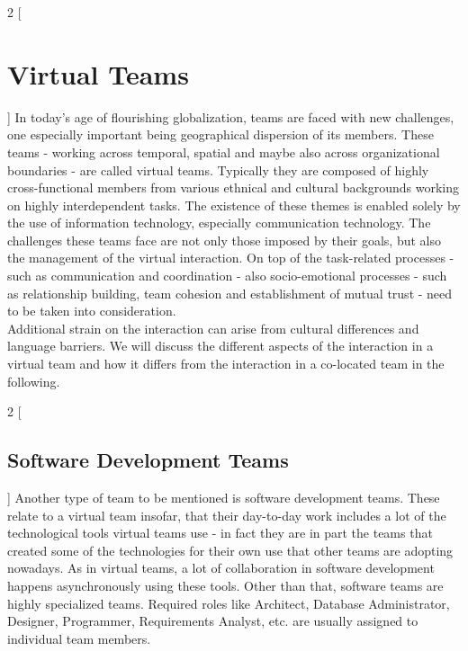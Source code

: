 \begin{multicols}{2}
[\section{Virtual Teams}]
In today's age of flourishing globalization, teams are faced with new challenges, one especially important being geographical dispersion of its members. These teams - working across temporal, spatial and maybe also across organizational boundaries - are called virtual teams. Typically they are composed of highly cross-functional members from various ethnical and cultural backgrounds working on highly interdependent tasks. The existence of these themes is enabled solely by the use of information technology, especially communication technology.
The challenges these teams face are not only those imposed by their goals, but also the management of the virtual interaction. On top of the task-related processes - such as communication and coordination - also socio-emotional processes - such as relationship building, team cohesion and establishment of mutual trust - need to be taken into consideration.\\\cite{Powell_Piccoli_Ives_2004} Additional strain on the interaction can arise from cultural differences and language barriers. We will discuss the different aspects of the interaction in a virtual team and how it differs from the interaction in a co-located team in the following.
\end{multicols}

\begin{multicols}{2}
[\subsection{Software Development Teams}]
Another type of team to be mentioned is software development teams. These relate to a virtual team insofar, that their day-to-day work includes a lot of the technological tools virtual teams use - in fact they are in part the teams that created some of the technologies for their own use that other teams are adopting nowadays. As in virtual teams, a lot of collaboration in software development happens asynchronously using these tools. Other than that, software teams are highly specialized teams. Required roles like Architect, Database Administrator, Designer, Programmer, Requirements Analyst, etc. \cite{IBM} are usually assigned to individual team members. 
\end{multicols}